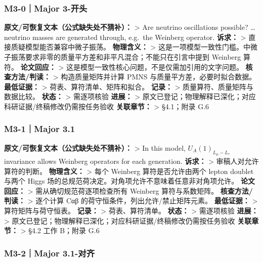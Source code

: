 \documentclass[
]{article}
\begin{document}
\subsubsection{M3-0｜Major 3-开头}\label{m3-0major-3-ux5f00ux5934}

\textbf{原文/可恢复文本（公式缺失处不猜补）：} \textgreater{} Are
neutrino oscillations possible? \ldots{} neutrino masses are generated
through, e.g.~the Weinberg operator. \textbf{诉求：} \textgreater{}
直接质疑模型能否兼容中微子振荡。 \textbf{物理含义：} \textgreater{}
这是一项模型一致性门槛。中微子振荡要求非零的质量平方差和非平凡混合；不能只在引言中提到
Weinberg 算符。 \textbf{论文回应：} \textgreater{}
这是模型一致性核心问题，不是仅需加引用的文字问题。
\textbf{核查方法/判读：} \textgreater{} 构造质量矩阵并计算 PMNS
与质量平方差，必要时拟合数据。 \textbf{最低证据：} \textgreater{}
荷表、算符清单、矩阵和拟合。 \textbf{记录：} \textgreater{}
质量算符、质量矩阵与数据比较。 \textbf{状态：} \textgreater{} 需逐项核验
\textbf{进展：} \textgreater{}
原文已登记；物理解释已深化；对应科研证据/终稿修改仍需按任务验收
\textbf{关联章节：} \textgreater{} §4.1；附录 G.6

\subsubsection{M3-1｜Major 3.1}\label{m3-1major-3.1}

\textbf{原文/可恢复文本（公式缺失处不猜补）：} \textgreater{} In this
model, \(U_A(1)_{L_{\mu}-L_{\tau}}\) invariance allows Weinberg
operators for each generation. \textbf{诉求：} \textgreater{}
审稿人对允许算符的判断。 \textbf{物理含义：} \textgreater{} 每个
Weinberg 算符是否允许由两个 lepton doublet 与两个 Higgs
场的总规范荷决定。对角项允许不意味着任意非对角项允许。
\textbf{论文回应：} \textgreater{} 需从确切规范荷逐项检查所有 Weinberg
算符与系数矩阵。 \textbf{核查方法/判读：} \textgreater{} 逐个计算 Cαβ
的荷守恒条件，列出允许/禁止矩阵元素。 \textbf{最低证据：} \textgreater{}
算符矩阵与荷守恒表。 \textbf{记录：} \textgreater{} 荷表、算符清单。
\textbf{状态：} \textgreater{} 需逐项核验 \textbf{进展：} \textgreater{}
原文已登记；物理解释已深化；对应科研证据/终稿修改仍需按任务验收
\textbf{关联章节：} \textgreater{} §4.2 工作 B；附录 G.6

\subsubsection{M3-2｜Major 3.1-对齐}\label{m3-2major-3.1-ux5bf9ux9f50}
\end{document}
